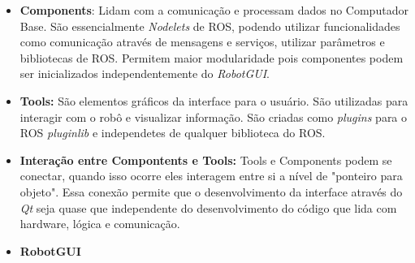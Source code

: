 \begin{itemize}
\item \textbf{Components}: Lidam com a comunicação e processam dados no Computador Base. São essencialmente \textit{Nodelets} de ROS, podendo utilizar funcionalidades como comunicação através de mensagens e serviços, utilizar parâmetros e bibliotecas de ROS. Permitem maior modularidade pois componentes podem ser inicializados independentemente do \textit{RobotGUI}.

\item \textbf{Tools:} São elementos gráficos da interface para o usuário. São utilizadas para interagir com o robô e visualizar informação. São criadas como \textit{plugins} para o ROS \textit{pluginlib} e independetes de qualquer biblioteca do ROS.

\item \textbf{Interação entre Compontents e Tools:} Tools e Components podem se conectar, quando isso ocorre eles interagem entre si a nível de "ponteiro para objeto". Essa conexão permite que o desenvolvimento da interface através do \textit{Qt} seja quase que independente do desenvolvimento do código que lida com hardware, lógica e comunicação.

\item \textbf{RobotGUI}
\end{itemize}



